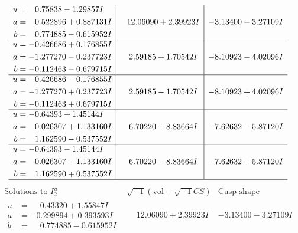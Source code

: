 \documentclass[1p]{elsarticle_modified}
\theoremstyle{definition}
\newcommand{\I}{\sqrt{-1}}
\begin{document}
$$\begin{array}{c|c|c}
\begin{aligned}
u &= \phantom{-}0.75838 - 1.29857 I \\
a &= \phantom{-}0.522896 + 0.887131 I \\
b &= \phantom{-}0.774885 - 0.615952 I\end{aligned}
 & \phantom{-}12.06090 + 2.39923 I & -3.13400 - 3.27109 I \\ \hline\begin{aligned}
u &= -0.426686 + 0.176855 I \\
a &= -1.277270 - 0.237723 I \\
b &= -0.112463 - 0.679715 I\end{aligned}
 & \phantom{-}2.59185 + 1.70542 I & -8.10923 - 4.02096 I \\ \hline\begin{aligned}
u &= -0.426686 - 0.176855 I \\
a &= -1.277270 + 0.237723 I \\
b &= -0.112463 + 0.679715 I\end{aligned}
 & \phantom{-}2.59185 - 1.70542 I & -8.10923 + 4.02096 I \\ \hline\begin{aligned}
u &= -0.64393 + 1.45144 I \\
a &= \phantom{-}0.026307 + 1.133160 I \\
b &= \phantom{-}1.162590 - 0.537552 I\end{aligned}
 & \phantom{-}6.70220 + 8.83664 I & -7.62632 - 5.87120 I \\ \hline\begin{aligned}
u &= -0.64393 - 1.45144 I \\
a &= \phantom{-}0.026307 - 1.133160 I \\
b &= \phantom{-}1.162590 + 0.537552 I\end{aligned}
 & \phantom{-}6.70220 - 8.83664 I & -7.62632 + 5.87120 I\\
 \hline 
 \end{array}$$\newpage$$\begin{array}{c|c|c}  
\text{Solutions to }I^u_{2}& \I (\text{vol} + \sqrt{-1}CS) & \text{Cusp shape}\\
 \hline 
\begin{aligned}
u &= \phantom{-}0.43320 + 1.55847 I \\
a &= -0.299894 + 0.393593 I \\
b &= \phantom{-}0.774885 - 0.615952 I\end{aligned}
 & \phantom{-}12.06090 + 2.39923 I & -3.13400 - 3.27109 I \\ \hline\begin{aligned}

\end{aligned}
\end{array}$$
\end{document}
